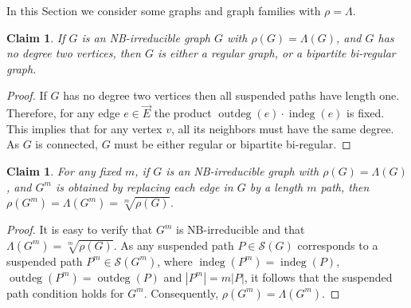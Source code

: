 \documentclass{article}
\newtheorem{claim}[theorem]{Claim}
\newcommand{\dirE}{\vec{E}}
\DeclareMathOperator{\outdeg}{outdeg}
\DeclareMathOperator{\indeg}{indeg}
\begin{document}
In this Section we consider some graphs and graph families with $\rho = \Lambda$.
\begin{claim}\label{claim:regular_biregular}
    If $G$ is an NB-irreducible graph $G$ with 
    $\rho(G) = \Lambda(G)$, and 
    $G$ has no degree two vertices, 
    then $G$ is either a regular graph, or 
    a bipartite bi-regular graph.
\end{claim}

\begin{proof}
        If $G$ has no degree two vertices then all suspended paths have length one.
        Therefore, for any edge $e \in \dirE$ the product $\outdeg(e) \cdot \indeg(e)$ is fixed. 
        This implies that for any vertex $v$, all its neighbors must have the same degree. 
        As $G$ is connected, $G$ must be either regular or bipartite bi-regular.
\end{proof}

\begin{claim}\label{claim:subdivision}
    For any fixed $m$, if $G$ is an NB-irreducible graph with 
    $\rho(G)=\Lambda(G)$, and $G^m$ is obtained by replacing each edge
    in $G$ by a length $m$ path, then $\rho(G^m)=\Lambda(G^m)=\sqrt[m]{\rho(G)}$.
\end{claim}

\begin{proof}
    It is easy to verify that $G^m$ is NB-irreducible and that $\Lambda(G^m) = \sqrt[m]{\rho(G)}$.
    As any suspended path $P \in \mathcal{S}(G)$ corresponds to a suspended path $P^m \in \mathcal{S}(G^m)$, 
    where $\indeg(P^m) = \indeg(P)$, $\outdeg(P^m) = \outdeg(P)$ and $|P^m| = m|P|$, 
    it follows that the suspended path condition holds for $G^m$. Consequently, $\rho(G^m)=\Lambda(G^m)$.
\end{proof}
\end{document}
